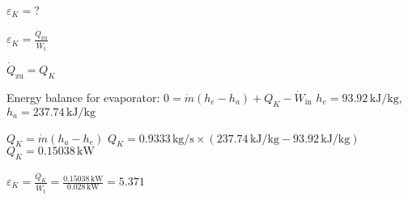 \( \varepsilon_K = ? \)  

\( \varepsilon_K = \frac{\dot{Q}_{\text{zu}}}{\dot{W}_{\text{t}}} \)  

\( \dot{Q}_{\text{zu}} = Q_K \)  

Energy balance for evaporator:  
\( 0 = \dot{m} (h_e - h_a) + Q_K - \dot{W}_{\text{in}} \)  
\( h_e = 93.92 \, \text{kJ/kg} \), \( h_a = 237.74 \, \text{kJ/kg} \)  

\( Q_K = \dot{m} (h_a - h_e) \)  
\( Q_K = 0.9333 \, \text{kg/s} \times (237.74 \, \text{kJ/kg} - 93.92 \, \text{kJ/kg}) \)  
\( Q_K = 0.15038 \, \text{kW} \)  

\( \varepsilon_K = \frac{\dot{Q}_K}{\dot{W}_{\text{t}}} = \frac{0.15038 \, \text{kW}}{0.028 \, \text{kW}} = 5.371 \)